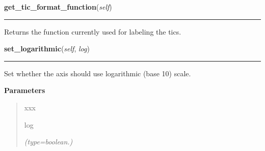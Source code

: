     \label{pygtk_chart:line_chart:Axis:get_tic_format_function}

    \vspace{0.5ex}

\hspace{.8\funcindent}\begin{boxedminipage}{\funcwidth}

    \raggedright \textbf{get\_tic\_format\_function}(\textit{self})

    \vspace{-1.5ex}

    \rule{\textwidth}{0.5\fboxrule}
\setlength{\parskip}{2ex}
    Returns the function currently used for labeling the tics.

\setlength{\parskip}{1ex}
    \end{boxedminipage}

    \label{pygtk_chart:line_chart:Axis:set_logarithmic}

    \vspace{0.5ex}

\hspace{.8\funcindent}\begin{boxedminipage}{\funcwidth}

    \raggedright \textbf{set\_logarithmic}(\textit{self}, \textit{log})

    \vspace{-1.5ex}

    \rule{\textwidth}{0.5\fboxrule}
\setlength{\parskip}{2ex}
    Set whether the axis should use logarithmic (base 10) scale.

\setlength{\parskip}{1ex}
      \textbf{Parameters}
      \vspace{-1ex}

      \begin{quote}
        \begin{Ventry}{xxx}

          \item[log]

            {\it (type=boolean.)}

        \end{Ventry}

      \end{quote}

    \end{boxedminipage}

